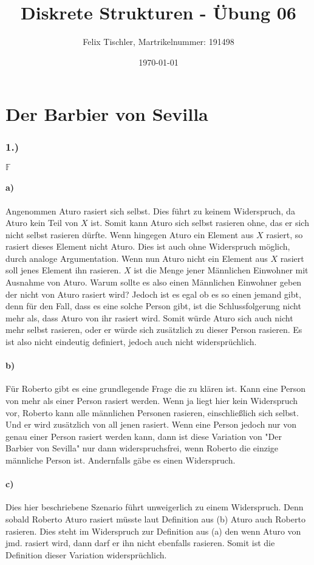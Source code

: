 \documentclass[titlepage]{article}
\begin{document}
	
	\title{Diskrete Strukturen - Übung 06}
	\author{Felix Tischler, Martrikelnummer: 191498}
	\date{\today}
	\maketitle
	
	\part*{Der Barbier von Sevilla}
		\section*{1.)}
		$\mathbb{F}$
			\subsection*{a)}
				Angenommen Aturo rasiert sich selbst. Dies führt zu keinem Widerspruch, da Aturo kein Teil von $X$ ist. Somit kann Aturo sich selbst rasieren ohne, das er sich nicht selbst rasieren dürfte. Wenn hingegen Aturo ein Element aus $X$ rasiert, so rasiert dieses Element nicht Aturo. Dies ist auch ohne Widerspruch möglich, durch analoge Argumentation. Wenn nun Aturo nicht ein Element aus $X$ rasiert soll jenes Element ihn rasieren. $X$ ist die Menge jener Männlichen Einwohner mit Ausnahme von Aturo. Warum sollte es also einen Männlichen Einwohner geben der nicht von Aturo rasiert wird? Jedoch ist es egal ob es so einen jemand gibt, denn für den Fall, dass es eine solche Person gibt, ist die Schlussfolgerung nicht mehr als, dass Aturo von ihr rasiert wird. Somit würde Aturo sich auch nicht mehr selbst rasieren, oder er würde sich zusätzlich zu dieser Person rasieren. Es ist also nicht eindeutig definiert, jedoch auch nicht widersprüchlich.
			\subsection*{b)}
				Für Roberto gibt es eine grundlegende Frage die zu klären ist. Kann eine Person von mehr als einer Person rasiert werden. Wenn ja liegt hier kein Widerspruch vor, Roberto kann alle männlichen Personen rasieren, einschließlich sich selbst. Und er wird zusätzlich von all jenen rasiert. Wenn eine Person jedoch nur von genau einer Person rasiert werden kann, dann ist diese Variation von "Der Barbier von Sevilla" nur dann widerspruchsfrei, wenn Roberto die einzige männliche Person ist. Andernfalls gäbe es einen Widerspruch.
			\subsection*{c)}
				Dies hier beschriebene Szenario führt unweigerlich zu einem Widerspruch. Denn sobald Roberto Aturo rasiert müsste laut Definition aus (b) Aturo auch Roberto rasieren. Dies steht im Widerspruch zur Definition aus (a) den wenn Aturo von jmd. rasiert wird, dann darf er ihn nicht ebenfalls rasieren. Somit ist die Definition dieser Variation widersprüchlich.
\end{document}
